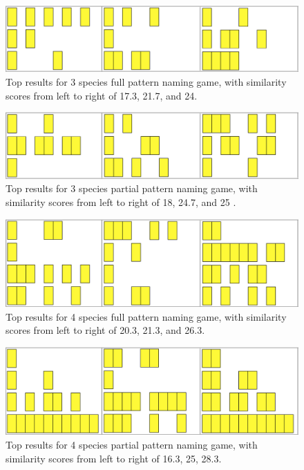 \begin{figure}[h]
\includegraphics[width = \columnwidth]{./pictures/3_lcs_one/all.png}
\caption{Top results for 3 species full pattern naming game, with similarity scores from left to right of 17.3, 21.7, and 24.}
\end{figure} 

\begin{figure}[h]
\includegraphics[width = \columnwidth]{./pictures/3_lcs_two/all.png}
\caption{Top results for 3 species partial pattern naming game, with similarity scores from left to right of 18, 24.7, and 25 .}
\end{figure} 

\begin{figure}[h]
\includegraphics[width = \columnwidth]{./pictures/4_lcs_one/all.png}
\caption{Top results for 4 species full pattern naming game, with similarity scores from left to right of 20.3, 21.3, and 26.3.}
\end{figure} 

\begin{figure}[h]
\includegraphics[width = \columnwidth]{./pictures/4_lcs_two/all.png}
\caption{Top results for 4 species partial pattern naming game, with similarity scores from left to right of 16.3, 25, 28.3.}
\end{figure} 

